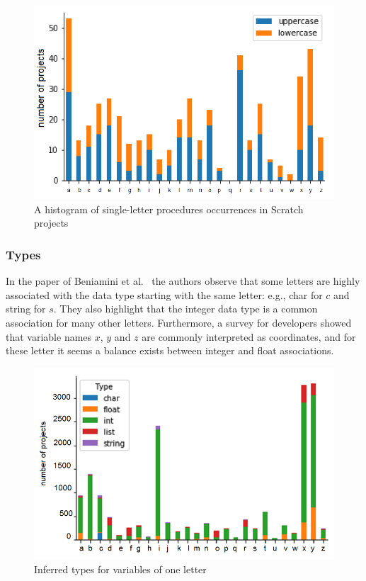 \documentclass[conference]{IEEEtran}
\begin{document}
\begin{figure}[tb]
	\begin{center}
		\includegraphics[width=0.95\columnwidth]{fig/project/single_letter_proc}
		\caption{A histogram of single-letter procedures occurrences in Scratch projects}
		\label{fig:one_letter_occurrence_procedures}
	\end{center}
\end{figure} 

\subsubsection{Types}
\label{res:types}

In the paper of Beniamini et al.~\cite{Beniamini} the authors observe that some letters are highly associated with the data type starting with the same letter: e.g., char for $c$ and string for $s$. They also highlight that the integer data type is a common association for many other letters. Furthermore, a survey for developers showed that variable names $x$, $y$ and $z$ are commonly interpreted as coordinates, and for these letter it seems a balance exists between integer and float associations. 
\begin{figure}[tb]
	\begin{center}
		\includegraphics[width=0.95\columnwidth]{fig/project/one_letter_type_double}
		\caption{Inferred types for variables of one letter}
		\label{fig:one_letter_type}
	\end{center}
\end{figure} 
\end{document}
